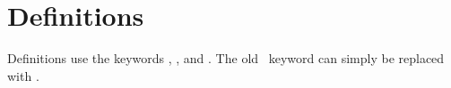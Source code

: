 
\section{Definitions}
\label{sec:definitions}

Definitions use the keywords , , and .  
The old \CAST\ keyword  can simply be replaced with .  

